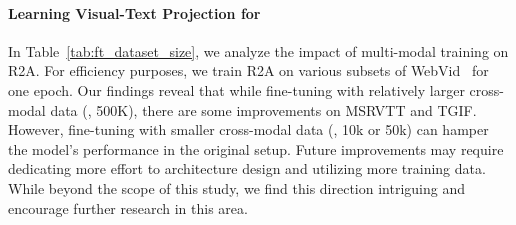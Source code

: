 \paragraph{Learning Visual-Text Projection for \shortmodelname} 
In Table~\ref{tab:ft_dataset_size}, we analyze the impact of multi-modal training on R2A. For efficiency purposes, we train R2A on various subsets of WebVid~\cite{frozenintime} for one epoch. Our findings reveal that while fine-tuning with relatively larger cross-modal data (\eg, 500K), there are some improvements on MSRVTT and TGIF. However, fine-tuning with smaller cross-modal data (\eg, 10k or 50k) can hamper the model's performance in the original setup. 
Future improvements may require dedicating more effort to architecture design and utilizing more training data. While beyond the scope of this study, we find this direction intriguing and encourage further research in this area.



\begin{table}[t]
    \centering
     \vspace{-2mm}
    \caption{{\bf Learning Visual-Text Projection for R2A.} In each experiment, we downsample the WebVid-10M dataset to the given size, and fix the number of training {\it epochs} to one.}
    \vspace{-5mm}
    \label{tab:ft_dataset_size}
\end{table}


%
 
\vspace{-2mm}